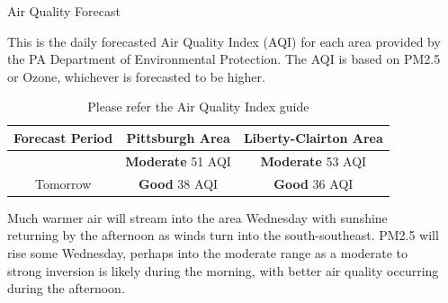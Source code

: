 \documentclass[final,xcolor=table]{beamer}
\newlength{\sepwidth}
\newlength{\colwidth}
\newcommand{\separatorcolumn}{\begin{column}{\sepwidth}\end{column}}
\begin{document}
\begin{frame}[t]
\begin{columns}[t]
\separatorcolumn

\begin{column}{\colwidth}

  \begin{block}{Air Quality Forecast}

    This is the daily forecasted Air Quality Index (AQI) for each area provided by the PA Department of Environmental Protection. The AQI is based on PM2.5 or Ozone, whichever is forecasted to be higher.

    \begin{table}
      \renewcommand{\arraystretch}{1.5}
      \centering
      \begin{tabular}{|c| c| c|}
        \hline
        \rowcolor{lightgray}\textbf{Forecast Period} & \textbf{Pittsburgh Area} & \textbf{Liberty-Clairton Area} \\
        \hline
        \rowcolor[HTML]{F2FDFE}{Today} & {\textbf{Moderate} 51 AQI} & {\textbf{Moderate} 53 AQI} \\
        \hline
        \rowcolor[HTML]{F2FDFE}Tomorrow & {\textbf{Good} 38 AQI} & {\textbf{Good} 36 AQI} \\
        \hline
      \end{tabular}
      \caption{Please refer the Air Quality Index guide}
    \end{table}

    Much warmer air will stream into the area Wednesday with sunshine returning by the afternoon as winds turn into the south-southeast. PM2.5 will rise some Wednesday, perhaps into the moderate range as a moderate to strong inversion is likely during the morning, with better air quality occurring during the afternoon.
    


\end{block}
\end{column}
\end{columns}
\end{frame}
\end{document}
